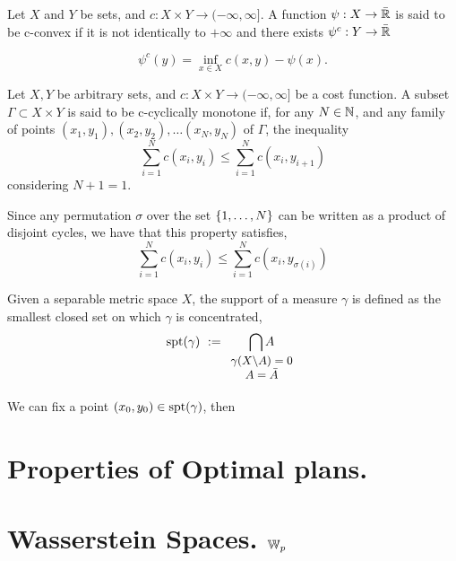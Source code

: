 \begin{definition}[c-transform]
	Let $X$ and $Y$ be sets, and $c:X\times Y \rightarrow (-\infty, \infty]$. A function $\psi: X\rightarrow \bar{\mathbb{R}}$ is said to be c-convex if it is not identically to $+\infty$ and there exists $\psi^c: Y \rightarrow \bar{\mathbb{R}}$
	
	\begin{equation}
		\psi^c(y)= \inf_{x\in X} c(x,y)-\psi(x).
	\end{equation}
\end{definition}

\begin{definition}
	Let $X , Y$ be arbitrary sets, and $c:X\times Y \rightarrow (-\infty, \infty]$ be a cost function. A subset $\Gamma \subset X \times Y$ is said to be c-cyclically monotone if, for any $N\in\mathbb{N}$, and any family of points $(x_1, y_1), (x_2, y_2), \dots (x_N, y_N)$ of $\Gamma$, the inequality
	\begin{equation*}
		\sum_{i=1}^{N} c(x_i, y_i) \leq \sum_{i=1}^{N} c(x_i, y_{i+1}) 
	\end{equation*} 
	considering $N+1=1$. 
\end{definition}
Since any permutation $\sigma$ over the set $\left\lbrace 1, \dots, N \right\rbrace$ can be written as a product of disjoint cycles, we have that this property satisfies,
\begin{equation}
		\sum_{i=1}^{N} c(x_i, y_i) \leq \sum_{i=1}^{N} c(x_i, y_{\sigma(i)}) 
\end{equation}
\begin{definition}
	Given a separable metric space $X$, the support of a measure $\gamma$ is defined as the smallest closed set on which $\gamma$ is concentrated,
	\begin{equation}
	\spt(\gamma)\ :=\underset{\small{\begin{array}{c}
		\gamma(X\backslash A)=0\\ A=\bar{A}  \end{array}}}{\bigcap A} 		
	\end{equation} 
\end{definition}
We can fix a point $(x_0, y_0) \in \mathrm{spt}(\gamma)$, then 
\begin{theorem}
	
\end{theorem}

\section{Properties of Optimal plans.}
\section{Wasserstein Spaces. $\mathbb{W}_{p}$}